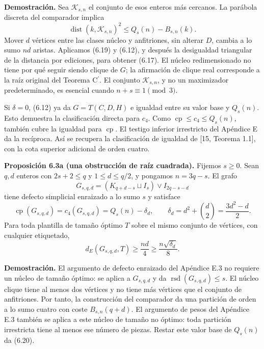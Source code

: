 \documentclass[spanish,11pt,a4paper]{article}
\begin{document}
\textbf{Demostración.} Sea \(\mathcal K_{s,n}\) el conjunto de esos enteros más cercanos. La parábola discreta del comparador implica \[
\operatorname{dist}(k,\mathcal K_{s,n})^2
\le Q_s(n)-B_{s,n}(k).
\tag{6.19}
\] Mover \(d\) vértices entre las clases núcleo y anfitriones, sin alterar \(D\), cambia a lo sumo \(nd\) aristas. Aplicamos (6.19) y (6.12), y después la desigualdad triangular de la distancia por ediciones, para obtener (6.17). El núcleo redimensionado no tiene por qué seguir siendo clique de \(G\); la afirmación de clique real corresponde a la raíz original del Teorema \texorpdfstring{C\ensuremath{^{\prime}}}{C'}. El conjunto \(\mathcal K_{s,n}\), y no un maximizador predeterminado, es esencial cuando \(n+s\equiv1\pmod3\).

Si \(\delta=0\), (6.12) ya da \(G=T(C,D,H)\) e igualdad entre su valor base y \(Q_s(n)\). Esto demuestra la clasificación directa para \(c_4\). Como \(\operatorname{cp}\le c_4\le Q_s(n)\), también cubre la igualdad para \(\operatorname{cp}\). El testigo inferior irrestricto del Apéndice E da la recíproca. Así se recupera la clasificación de igualdad de {[}15, Teorema 1.1{]}, con la cota superior adicional de orden cuatro.


\textbf{Proposición 6.3a (una obstrucción de raíz cuadrada).} Fijemos \(s\ge0\). Sean \(q,d\) enteros con \(2s+2\le q\) y \(1\le d\le q/2\), y pongamos \(n=3q-s\). El grafo \[
G_{s,q,d}=(K_{q+d-s}\sqcup I_s)\vee I_{2q-s-d}
\] tiene defecto simplicial enraizado a lo sumo \(s\) y satisface \[
\operatorname{cp}(G_{s,q,d})=c_4(G_{s,q,d})
=Q_s(n)-\delta_d,\qquad
\delta_d=d^2+\binom d2=\frac{3d^2-d}{2}.
\tag{6.20}
\] Para toda plantilla de tamaño óptimo \(T\) sobre el mismo conjunto de vértices, con cualquier etiquetado, \[
d_E(G_{s,q,d},T)\ge\frac{nd}{4}
\ge\frac{n\sqrt{\delta_d}}8.
\tag{6.21}
\]

\textbf{Demostración.} El argumento de defecto enraizado del Apéndice E.3 no requiere un núcleo de tamaño óptimo: se aplica a \(G_{s,q,d}\) y da \(\operatorname{rsd}(G_{s,q,d})\le s\). El núcleo clique tiene al menos dos vértices y no tiene más vértices que el conjunto de anfitriones. Por tanto, la construcción del comparador da una partición de orden a lo sumo cuatro con coste \(B_{s,n}(q+d)\). El argumento de pesos del Apéndice E.3 también se aplica a este núcleo de tamaño no óptimo: toda partición irrestricta tiene al menos ese número de piezas. Restar este valor base de \(Q_s(n)\) da (6.20).
\end{document}
